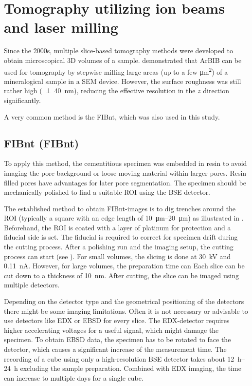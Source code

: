 \section{Tomography utilizing ion beams and laser milling}

Since the 2000s, multiple slice-based tomography methods were developed to obtain microscopical 3D volumes of a sample.
\textcite{desbois.2013} demonstrated that \ac{ArBIB} can be used for tomography by stepwise milling large areas (up to a few \unit{\square\micro\meter}) of a mineralogical sample in a \ac{SEM} device.
However, the surface roughness was still rather high (\qty{\pm 40}{\nano\meter}), reducing the effective resolution in the $z$ direction significantly.

A very common method is the \ac{FIBnt}, which was also used in this study.

\subsection{\Acl*{FIBnt} (\acs*{FIBnt})}
\label{sec:fib}

To apply this method, the cementitious specimen was embedded in resin to avoid imaging the pore background or loose moving material within larger pores.
Resin filled pores have advantages for later pore segmentation.
The specimen should be mechanically polished to find a suitable \ac{ROI} using the \ac{BSE} detector.

The established method to obtain \ac{FIBnt}-images is to dig trenches around the \ac{ROI} (typically a square with an edge length of \qtyrange{10}{20}{\micro\meter}) as illustrated in .
Beforehand, the \ac{ROI} is coated with a layer of platinum for protection and a fiducial side is set.
The fiducial is required to correct for specimen drift during the cutting process.
After a polishing run and the imaging setup, the cutting process can start (see ).
For small volumes, the slicing is done at \qty{30}{\kilo\volt} and \qty{0.11}{\nano\ampere}.
However, for large volumes, the preparation time can  %
Each slice can be cut down to a thickness of \qty{10}{\nano\meter}.
After cutting, the slice can be imaged using multiple detectors.

Depending on the detector type and the geometrical positioning of the detectors there might be some imaging limitations.
Often it is not necessary or advisable to use detectors like \ac{EDX} or \ac{EBSD} for every slice.
The \ac{EDX}-detector requires higher accelerating voltages for a useful signal, which might damage the specimen.
To obtain \ac{EBSD} data, the specimen has to be rotated to face the detector, which causes a significant increase of the measurement time.
The recording of a  cube using only a high-resolution BSE detector takes about \qtyrange{12}{24}{\hour} excluding the sample preparation.
Combined with \ac{EDX} imaging, the time can increase to multiple days for a single cube.

